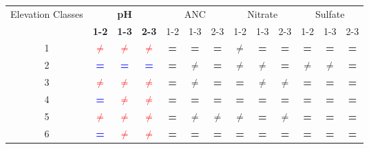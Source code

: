 \begin{table}\scriptsize
\begin{center}
\begin{tabular}{ccccccccccccc}
\toprule
 \multicolumn{1}{p{1cm}}{Elevation Classes}& \multicolumn{ 3}{c}{\textbf{pH}} & \multicolumn{ 3}{c}{ANC} & \multicolumn{ 3}{c}{Nitrate} & \multicolumn{ 3}{c}{Sulfate} \\ \cline{2-13}\noalign{\smallskip}
 & \multicolumn{ 1}{c}{\textbf{1-2}} & \textbf{1-3} & \textbf{2-3} & 1-2 & 1-3 &2-3 & 1-2 &1-3 &2-3&1-2 & 1-3 & 2-3 \\  \cline{2-13}
\multicolumn{1}{c}{1} & \textcolor{red}{\textbf{$\neq$}} & \textcolor{red}{\textbf{$\neq$}} & \textcolor{red}{\textbf{$\neq$}}                          & \textbf{=} & \textbf{=} & \textbf{=} & \textbf{$\neq$} & \textbf{=} & \textbf{=} & \textbf{=} & \textbf{=} & \textbf{=} \\ 
\multicolumn{1}{c}{2} & \textcolor{blue}{\textbf{=}} & \textcolor{blue}{\textbf{=}} & \textcolor{blue}{\textbf{=}}                                                & \textbf{=} & \textbf{$\neq$} & \textbf{=} & \textbf{$\neq$} & \textbf{$\neq$} & \textbf{=} & \textbf{$\neq$} & \textbf{$\neq$} & \textbf{=} \\ 
\multicolumn{1}{c}{3} & \textcolor{red}{\textbf{$\neq$}} & \textcolor{red}{\textbf{$\neq$}} & \textcolor{red}{\textbf{$\neq$}}                          & \textbf{=} & \textbf{$\neq$} & \textbf{=} & \textbf{=} & \textbf{$\neq$} & \textbf{$\neq$} & \textbf{=} & \textbf{=} & \textbf{=} \\ 
\multicolumn{1}{c}{4} & \textcolor{blue}{\textbf{=}} & \textcolor{red}{\textbf{$\neq$}} & \textcolor{red}{\textbf{$\neq$}}                                  & \textbf{=} & \textbf{=} & \textbf{=} & \textbf{=} & \textbf{=} & \textbf{=} & \textbf{=} & \textbf{=} & \textbf{=} \\ 
\multicolumn{1}{c}{5} & \textcolor{red}{\textbf{$\neq$}} & \textcolor{red}{\textbf{$\neq$}} & \textcolor{red}{\textbf{$\neq$}}                           & \textbf{=} & \textbf{$\neq$} & \textbf{$\neq$} & \textbf{$\neq$} & \textbf{=} & \textbf{$\neq$} & \textbf{=} & \textbf{=} & \textbf{=} \\ 
\multicolumn{1}{c}{6} & \textcolor{blue}{\textbf{=}} & \textcolor{red}{\textbf{$\neq$}} & \textcolor{red}{\textbf{$\neq$}}                                  & \textbf{=} & \textbf{=} & \textbf{=} & \textbf{=} & \textbf{=} & \textbf{=} & \textbf{=} & \textbf{=} & \textbf{=} \\ 
\bottomrule
\end{tabular}
\end{center}
\end{table}